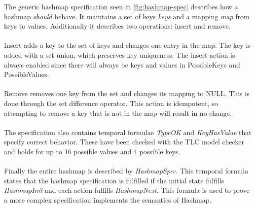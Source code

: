 \documentclass{uit-thesis}
\begin{document}
The generic hashmap specification seen in \autoref{fig:hashmap-spec} describes how a hashmap \emph{should} behave. It maintains a set of keys \textit{keys} and a mapping \textit{map} from keys to values. Additionally it describes two operations: insert and remove.
\\\\
Insert adds a key to the set of keys and changes one entry in the map. The key is added with a set union, which preserves key uniqueness. The insert action is always enabled since there will always be keys and values in PossibleKeys and PossibleValues.
\\\\
Remove removes one key from the set and changes its mapping to NULL. This is done through the set difference operator. This action is idempotent, so attempting to remove a key that is not in the map will result in no change.
\\\\
The specification also contains temporal formulae \textit{TypeOK} and \textit{KeyHasValue} that specify correct behavior. These have been checked with the TLC model checker and holds for up to 16 possible values and 4 possible keys.
\\\\
Finally the entire hashmap is described by \textit{HashmapSpec}. This temporal formula states that the hashmap specification is fulfilled if the initial state fulfills \textit{HashmapInit} and each action fulfills \textit{HashmapNext}. This formula is used to prove a more complex specification implements the semantics of Hashmap.
\end{document}
